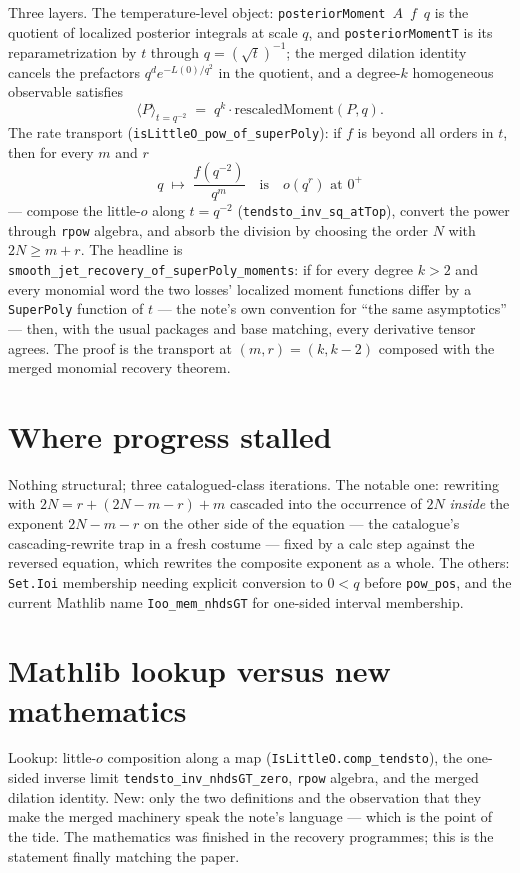 \documentclass[11pt]{article}
\newcommand{\code}[1]{\texttt{#1}}
\begin{document}
Three layers. The temperature-level object:
\code{posteriorMoment}~$A$~$f$~$q$ is the quotient of localized
posterior integrals at scale $q$, and \code{posteriorMomentT} is its
reparametrization by $t$ through $q = (\sqrt t)^{-1}$; the merged
dilation identity cancels the prefactors $q^d e^{-L(0)/q^2}$ in the
quotient, and a degree-$k$ homogeneous observable satisfies
\[
  \langle P \rangle_{t = q^{-2}}
  \;=\; q^{k} \cdot \mathrm{rescaledMoment}(P, q).
\]
The rate transport (\code{isLittleO\_pow\_of\_superPoly}): if $f$ is
beyond all orders in $t$, then for every $m$ and $r$
\[
  q \;\longmapsto\; \frac{f(q^{-2})}{q^m}
  \quad\text{is}\quad o(q^r) \text{ at } 0^+
\]
--- compose the little-$o$ along $t = q^{-2}$
(\code{tendsto\_inv\_sq\_atTop}), convert the power through
\code{rpow} algebra, and absorb the division by choosing the
order $N$ with $2N \geq m + r$. The headline is\\
\code{smooth\_jet\_recovery\_of\_superPoly\_moments}: if for every
degree $k > 2$ and every monomial word the two losses' localized
moment functions differ by a \code{SuperPoly} function of $t$ ---
the note's own convention for ``the same asymptotics'' --- then,
with the usual packages and base matching, every derivative
tensor agrees. The proof is the transport at $(m, r) = (k, k-2)$
composed with the merged monomial recovery theorem.

\section{Where progress stalled}

Nothing structural; three catalogued-class iterations. The notable
one: rewriting with $2N = r + (2N - m - r) + m$ cascaded into the
occurrence of $2N$ \emph{inside} the exponent $2N - m - r$ on the
other side of the equation --- the catalogue's cascading-rewrite
trap in a fresh costume --- fixed by a calc step against the
reversed equation, which rewrites the composite exponent as a whole.
The others: \code{Set.Ioi} membership needing explicit conversion to
$0 < q$ before \code{pow\_pos}, and the current Mathlib name
\code{Ioo\_mem\_nhdsGT} for one-sided interval membership.

\section{Mathlib lookup versus new mathematics}

Lookup: little-$o$ composition along a map
(\code{IsLittleO.comp\_tendsto}), the one-sided inverse limit
\code{tendsto\_inv\_nhdsGT\_zero}, \code{rpow} algebra, and the
merged dilation identity. New: only the two definitions and the
observation that they make the merged machinery speak the note's
language --- which is the point of the tide. The mathematics was
finished in the recovery programmes; this is the statement finally
matching the paper.
\end{document}
